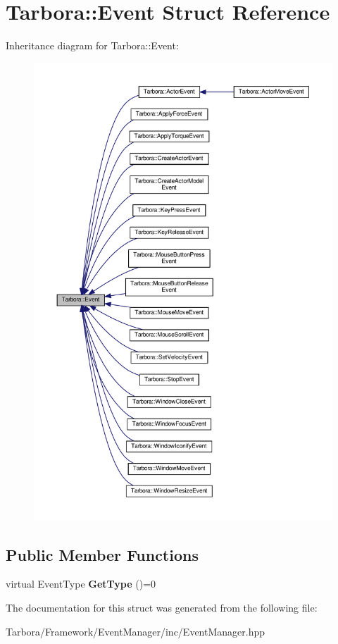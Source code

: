 \hypertarget{structTarbora_1_1Event}{}\section{Tarbora\+:\+:Event Struct Reference}
\label{structTarbora_1_1Event}


Inheritance diagram for Tarbora\+:\+:Event\+:\nopagebreak
\begin{figure}[H]
\begin{center}
\leavevmode
\includegraphics[width=350pt]{structTarbora_1_1Event__inherit__graph}
\end{center}
\end{figure}
\subsection*{Public Member Functions}
\begin{DoxyCompactItemize}
\item 
\mbox{\label{structTarbora_1_1Event_a74c8642f5aff04c726bac9b9b37b90ba}} 
virtual Event\+Type {\bfseries Get\+Type} ()=0
\end{DoxyCompactItemize}


The documentation for this struct was generated from the following file\+:\begin{DoxyCompactItemize}
\item 
Tarbora/\+Framework/\+Event\+Manager/inc/Event\+Manager.\+hpp\end{DoxyCompactItemize}
